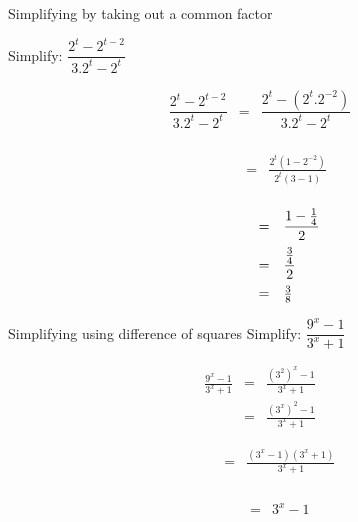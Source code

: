 \begin{wex}
{%
Simplifying by taking out a common factor
}
{%
Simplify: $\dfrac{2^t-2^{t-2}}{3.2^t-2^t} $

}
{%
\begin{eqnarray*}
\dfrac{2^t-2^{t-2}}{3.2^t-2^t} & = & \dfrac{2^t-(2^t.2^{-2})}{3.2^t-2^t} \\
\end{eqnarray*}


\begin{eqnarray*}
\phantom{\frac{2^t-2^{t-2}}{3.2^t-2^t}}  & = & \frac{2^t(1-2^{-2})}{2^t(3-1)} \\
\end{eqnarray*}



\begin{equation*}
 \begin{array}{rcl}
 \phantom{\frac{2^t-2^{t-2}}{3.2^t-2^t}}  & = & \dfrac{1- \frac{1}{4}}{2} \vspace{5pt}\\
					     & = & \dfrac{\frac{3}{4}}{2} \vspace{5pt}\\
					     & = & \frac{3}{8} 
 \end{array}

\end{equation*}




} 
\end{wex}




\begin{wex}
{
Simplifying using difference of squares
}
{
Simplify: 
$ \dfrac{9^x-1}{3^x+1} $
}
{
\begin{eqnarray*}
 \frac{9^x-1}{3^x+1} & = & \frac{(3^2)^x -1}{3^x+1} \\
		     & = & \frac{(3^x)^2-1}{3^x+1} 
\end{eqnarray*}


\begin{eqnarray*}
 \phantom{\frac{9^x-1}{3^x+1}} & = & \frac{(3^x-1)(3^x+1)}{3^x+1}\\
\end{eqnarray*}


\begin{eqnarray*}
 \phantom{\frac{9^x-1}{3^x+1}} & = & 3^x-1\\
\end{eqnarray*}

}
\end{wex}


